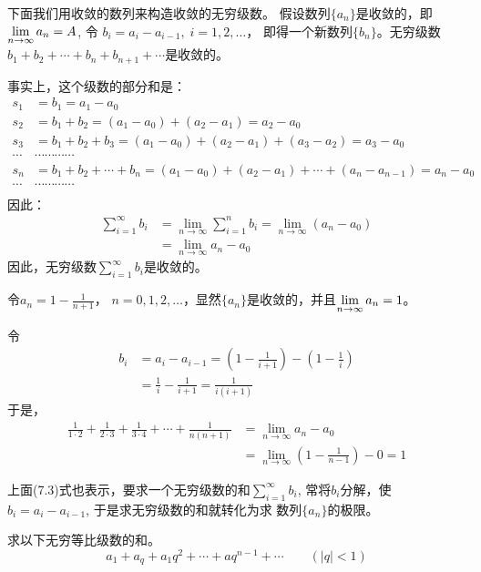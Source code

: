 下面我们用收敛的数列来构造收敛的无穷级数。
假设数列$\{a_n\}$是收敛的，即$\displaystyle\lim_{n\to\infty}a_n=A$, 令
$b_i=a_i-a_{i-1},\; i=1,2,\ldots$，
即得一个新数列$\{b_n\}$。无穷级数
$b_1+b_2+\cdots+b_n+b_{n+1}+\cdots$是收敛的。

事实上，这个级数的部分和是：
\[\begin{split}
    s_1&=b_1=a_1-a_0\\
    s_2&=b_1+b_2=(a_1-a_0)+(a_2-a_1)=a_2-a_0\\
    s_3&=b_1+b_2+b_3=(a_1-a_0)+(a_2-a_1)+(a_3-a_2)=a_3-a_0\\
    \cdots & \cdots\cdots\cdots\cdots\\
    s_n&=b_1+b_2+\cdots +b_n=(a_1-a_0)+(a_2-a_1)+\cdots +(a_n-a_{n-1})=a_n-a_0\\
    \cdots & \cdots\cdots\cdots\cdots\\
\end{split} \]
因此：
\begin{equation}
    \begin{split}
        \sum^{\infty}_{i=1}b_i&=\lim_{n\to\infty}\sum^n_{i=1}b_i=\lim_{n\to\infty}(a_n-a_0)\\
        &=\lim_{n\to\infty}a_n-a_0
    \end{split}
\end{equation}
因此，无穷级数$\sum^{\infty}_{i=1}b_i$是收敛的。


\begin{example}
令$a_n=1-\frac{1}{n+1}$， $n=0,1,2,\ldots$，显然$\{a_n\}$是收敛的，并且$\displaystyle\lim_{n\to \infty}a_n=1$。

令\[\begin{split}
    b_i&=a_{i}-a_{i-1}=\left(1-\frac{1}{i+1}\right)-\left(1-\frac{1}{i}\right)\\
    &=\frac{1}{i}-\frac{1}{i+1}=\frac{1}{i(i+1)}
\end{split}\]
于是，      
\[\begin{split}
    \frac{1}{1\cdot 2}+\frac{1}{2\cdot 3}+\frac{1}{3\cdot 4}+\cdots +\frac{1}{n(n+1)}&=\lim_{n\to\infty}a_n-a_0\\
    &=\lim_{n\to\infty}\left(1-\frac{1}{n-1}\right)-0=1
\end{split}\]

上面(7.3)式也表示，要求一个无穷级数的和$\sum^{\infty}_{i=1}b_i$, 常将$b_i$分解，使$b_i=a_i-a_{i-1}$, 于是求无穷级数的和就转化为求
数列$\{a_n\}$的极限。
\end{example}

\begin{example}
    求以下无穷等比级数的和。
    \[a_1+a_q+a_1q^2+\cdots +aq^{n-1}+\cdots \qquad (|q|<1)\]
\end{example}


